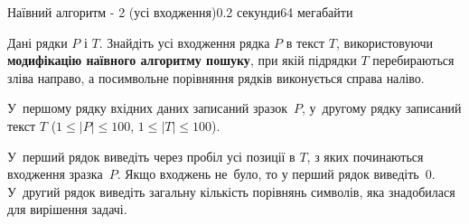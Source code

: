 \begin{problem}{Наївний алгоритм - 2 (усі входження)}{}{}{0.2 секунди}{64 мегабайти}

Дані рядки $P$ і $T$. Знайдіть усі входження рядка $P$ в текст $T$, використовуючи {\bf модифікацію наївного алгоритму пошуку}, 
при якій підрядки $T$ перебираються зліва направо, а посимвольне порівняння рядків виконується справа наліво.

\InputFile
У~першому рядку вхідних даних записаний зразок~$P$, 
у~другому рядку записаний текст $T$ ($1 \le |P| \le 100$, $1 \le |T| \le 100$).


\OutputFile
У~перший рядок виведіть через пробіл усі позиції в $T$, з яких починаються входження зразка~$P$. 
Якщо входжень не~було, то у перший рядок виведіть~0.
У~другий рядок виведіть загальну кількість порівнянь символів, яка знадобилася для вирішення задачі. 

\Examples

\begin{example}
%
\end{example}

\end{problem}

